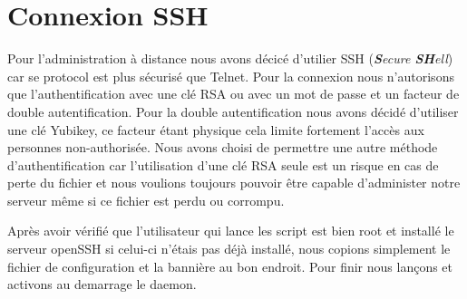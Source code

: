 \section{Connexion SSH}
Pour l'administration à distance nous avons décicé d'utilier SSH (\textit{\textbf{S}ecure \textbf{SH}ell}) car se protocol est plus sécurisé que Telnet. Pour la connexion nous n'autorisons que l'authentification avec une clé RSA ou avec un mot de passe et un facteur de double autentification. Pour la double autentification nous avons décidé d'utiliser une clé Yubikey, ce facteur étant physique cela limite fortement l'accès aux personnes non-authorisée. Nous avons choisi de permettre une autre méthode d'authentification car l'utilisation d'une clé RSA seule est un risque en cas de perte du fichier et nous voulions toujours pouvoir être capable d'administer notre serveur même si ce fichier est perdu ou corrompu.



Après avoir vérifié que l'utilisateur qui lance les script est bien root et installé le serveur openSSH si celui-ci n'étais pas déjà installé, nous copions simplement le fichier de configuration et la bannière au bon endroit. Pour finir nous lançons et activons au demarrage le daemon.
